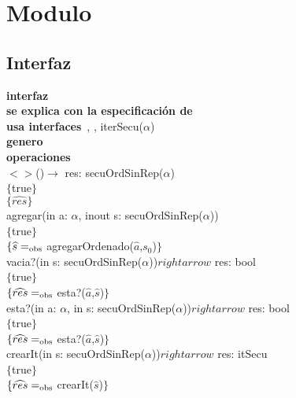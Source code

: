 \section*{Modulo }

\vspace{22pt}
\hspace{-0.75cm}
\subsection*{Interfaz}
\textbf{interfaz}\ \\
\textbf{se explica con la especificaci\'on de}\ \\
\textbf{usa interfaces}\ , \nombretad{$\alpha$}, iterSecu($\alpha$)\\
\textbf{genero}\ \\
\textbf{operaciones}\\

$<>$()$\rightarrow$ res: secuOrdSinRep($\alpha$)\\
$\{$true$\}$\\
$\{\widehat{res}\}$\\

agregar(in a: $\alpha$, inout s: secuOrdSinRep($\alpha$))\\
$\{$true$\}$\\
$\{\widehat{s}=_{\mathrm{obs}}$ agregarOrdenado($\widehat{a}$,$s_0$)$\}$\\

vacia?(in s: secuOrdSinRep($\alpha$))$rightarrow$ res: bool\\
$\{$true$\}$\\
$\{\widehat{res}=_{\mathrm{obs}}$ esta?($\widehat{a}$,$\widehat{s}$)$\}$\\

esta?(in a: $\alpha$, in s: secuOrdSinRep($\alpha$))$rightarrow$ res: bool\\
$\{$true$\}$\\
$\{\widehat{res}=_{\mathrm{obs}}$ esta?($\widehat{a}$,$\widehat{s}$)$\}$\\

crearIt(in s: secuOrdSinRep($\alpha$))$rightarrow$ res: itSecu\\
$\{$true$\}$\\
$\{\widehat{res}=_{\mathrm{obs}}$ crearIt($\widehat{s}$)$\}$\\

